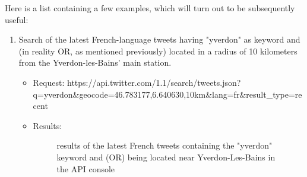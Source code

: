 \documentclass[a4paper,11pt]{report}
\begin{document}
Here is a list containing a few examples, which will turn out to be subsequently useful:
\begin{enumerate}
	\item Search of the latest French-language tweets having "yverdon" as keyword and (in reality OR, as mentioned previously) located in a radius of 10 kilometers from the Yverdon-les-Bains' main station.
	\begin{itemize}
		\item Request: https://api.twitter.com/1.1/search/tweets.json?\\q=yverdon\&geocode=46.783177,6.640630,10km\&lang=fr\&result\_type=recent
		\item Results:
		\begin{figure}[H]
		\vspace{-5pt}
		\begin{center}
		\vspace{-5pt}
		\caption{results of the latest French tweets containing the "yverdon" keyword and (OR) being located near Yverdon-Les-Bains in the API console}
		\end{center}
		\end{figure}
		\vspace{-20pt}
		

\end{itemize}
\end{enumerate}
\end{document}
